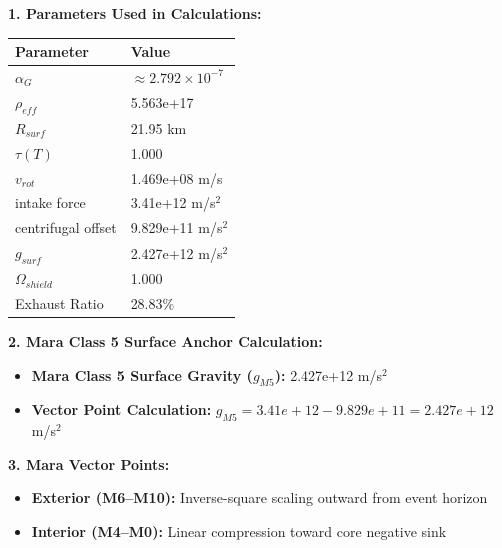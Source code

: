 \documentclass[11pt, a4paper]{article}
\begin{document}
\vspace{0.5em}
\noindent \textbf{1. Parameters Used in Calculations:}
\begin{center}
  \begin{tabular}{|l|l|}
    \hline
    \textbf{Parameter} & \textbf{Value} \\ \hline
    $\alpha_G$ & $\approx 2.792 \times 10^{-7}$ \\ \hline
    $\rho_{eff}$ & 5.563e+17 \\ \hline
    $R_{surf}$ & 21.95 km \\ \hline
    $\tau(T)$ & 1.000 \\ \hline
    $v_{rot}$ & 1.469e+08 m/s \\ \hline
    intake force & 3.41e+12 m/s$^2$ \\ \hline
    centrifugal offset & 9.829e+11 m/s$^2$ \\ \hline
    $g_{surf}$ & 2.427e+12 m/s$^2$ \\ \hline
    $\Omega_{shield}$ & 1.000 \\ \hline
    Exhaust Ratio & 28.83\% \\ \hline
  \end{tabular}
\end{center}

\vspace{0.5em}
\noindent \textbf{2. Mara Class 5 Surface Anchor Calculation:}
\begin{itemize}
  \item \textbf{Mara Class 5 Surface Gravity ($g_{M5}$):} 2.427e+12 m/s$^2$
  \item \textbf{Vector Point Calculation:} $g_{M5} = 3.41e+12 - 9.829e+11 = 2.427e+12$ m/s$^2$
\end{itemize}

\vspace{0.5em}
\noindent \textbf{3. Mara Vector Points:}
\begin{itemize}
  \item \textbf{Exterior (M6--M10):} Inverse-square scaling outward from event horizon
  \item \textbf{Interior (M4--M0):} Linear compression toward core negative sink
\end{itemize}
\end{document}
